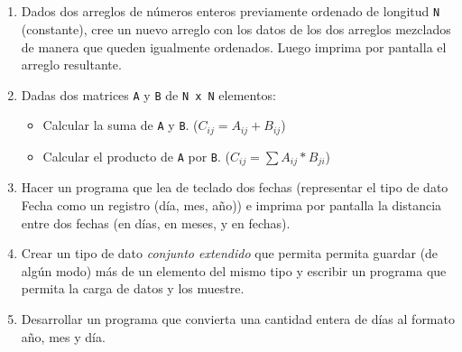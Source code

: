 \documentclass[landscape,a5paper,10pt]{article}
\begin{document}
~\\ \\ \\ \\

\begin{enumerate}


\item Dados dos arreglos de n\'umeros enteros previamente ordenado de longitud \verb=N= (constante), cree un nuevo arreglo con los datos de los dos arreglos mezclados de manera que queden igualmente ordenados. Luego imprima por pantalla el arreglo resultante.

\item Dadas dos matrices \verb=A= y \verb=B= de \verb=N x N= elementos:
\begin{itemize}
  \item[a-] Calcular la suma de \verb=A= y \verb=B=. ($C_{ij} = A_{ij} + B_{ij}$)
  \item[b-] Calcular el producto de \verb=A= por \verb=B=. ($C_{ij} = \sum A_{ij} * B_{ji} $)
\end{itemize}

\item Hacer un programa que lea de teclado dos fechas (representar el tipo de dato Fecha como un registro (d\'ia, mes, a\~no)) e imprima por pantalla la distancia entre dos fechas (en d\'ias, en meses, y en fechas).
    

\item Crear un tipo de dato \emph{conjunto extendido} que permita permita guardar (de alg\'un modo) m\'as de un elemento del mismo tipo y escribir un programa que permita la carga de datos y los muestre.

\item Desarrollar un programa que convierta una cantidad entera de d\'ias al formato a\~no, mes y d\'ia.


\end{enumerate}
\end{document}
